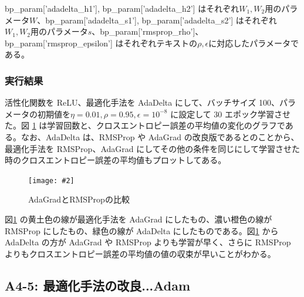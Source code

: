 \documentclass[a4paper,dvipdfmx]{jsarticle}
\newcommand{\image}[3]{
    \begin{figure}[H]
        \begin{center}
        \texttt{[image: \#2]}
        \end{center}
        \caption{#1}
        \label{#3}
    \end{figure}
}
\begin{document}
bp\_param['adadelta\_h1'], bp\_param['adadelta\_h2'] はそれぞれ$W_1, W_2$用のパラメータ$W$、bp\_param['adadelta\_s1'], bp\_param['adadelta\_s2'] はそれぞれ$W_1, W_2$用のパラメータ$s$、bp\_param['rmsprop\_rho']、bp\_param['rmsprop\_epsilon'] はそれぞれテキストの$\rho, \epsilon$に対応したパラメータである。

\subsubsection*{実行結果}

活性化関数を ReLU、最適化手法を AdaDelta にして、バッチサイズ 100、パラメータの初期値を$\eta = 0.01, \rho = 0.95, \epsilon = 10^{-8}$ に設定して 30 エポック学習させた。図 \ref{fig-A4-4-1} は学習回数と、クロスエントロピー誤差の平均値の変化のグラフである。なお、AdaDelta は、RMSProp や AdaGrad の改良版であるとのことから、最適化手法を RMSProp、AdaGrad にしてその他の条件を同じにして学習させた時のクロスエントロピー誤差の平均値もプロットしてある。

\image{AdaGradとRMSPropの比較}{report_a4-4.png}{fig-A4-4-1}

図\ref{fig-A4-4-1} の黄土色の線が最適化手法を AdaGrad にしたもの、濃い橙色の線が RMSProp にしたもの、緑色の線が AdaDelta にしたものである。図\ref{fig-A4-4-1} から AdaDelta の方が AdaGrad や RMSProp よりも学習が早く、さらに RMSProp よりもクロスエントロピー誤差の平均値の値の収束が早いことがわかる。

\subsection*{A4-5: 最適化手法の改良...Adam}
\end{document}
